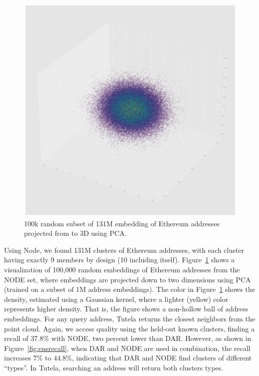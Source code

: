 \begin{figure}[h!]
\includegraphics[width=\linewidth]{figures/diff2vec_sample}
\caption{100k random subset of 131M embedding of Ethereum addresses projected from to 3D using PCA.}
\label{fig:diff2vecgraph}
\end{figure}
Using Node, we found 131M clusters of Ethereum addresses, with each cluster having exactly 9 members by design (10 including itself). Figure~\ref{fig:diff2vecgraph} shows a visualization of 100,000 random embeddings of Ethereum addresses from the NODE set, where embeddings are projected down to two dimensions using PCA (trained on a subset of 1M address embeddings). The color in Figure~\ref{fig:diff2vecgraph} shows the density, estimated using a Gaussian kernel, where a lighter (yellow) color represents higher density. That is, the figure shows a non-hollow ball of address embeddings. For any query address, Tutela returns the closest neighbors from the point cloud. Again, we access quality using the held-out known clusters, finding a recall of 37.8\% with NODE, two percent lower than DAR. However, as shown in Figure~\ref{fig:ensrecall}, when DAR and NODE are used in combination, the recall increases 7\% to 44.8\%, indicating that DAR and NODE find clusters of different ``types''. In Tutela, searching an address will return both clusters types.

